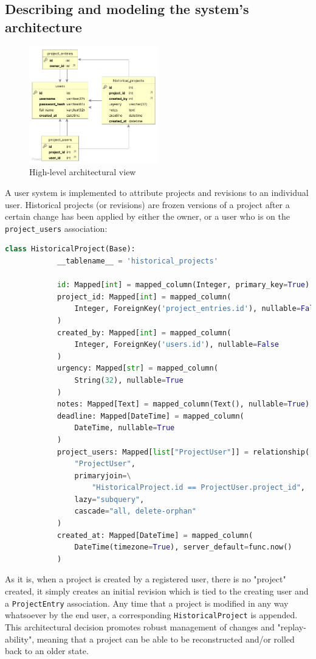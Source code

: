 \documentclass{report}
\begin{document}
	\subsection{Describing and modeling the system’s architecture}
	\vspace{1em}
	\begin{figure}[h]
		\centering
		\includegraphics[width=0.5\textwidth]{overview}
		\caption{High-level architectural view}
	\end{figure}
	\vspace{1em}
	A user system is implemented to attribute projects and revisions to an individual user. Historical projects (or revisions)
	are frozen versions of a project after a certain change has been applied by either the owner, or a user who is 
	on the \verb|project_users| association:
	\vspace{1.5em}
	\begin{lstlisting}[language=Python]
		class HistoricalProject(Base):
			__tablename__ = 'historical_projects'
			
			id: Mapped[int] = mapped_column(Integer, primary_key=True)
			project_id: Mapped[int] = mapped_column(
				Integer, ForeignKey('project_entries.id'), nullable=False
			)
			created_by: Mapped[int] = mapped_column(
				Integer, ForeignKey('users.id'), nullable=False
			)
			urgency: Mapped[str] = mapped_column(
				String(32), nullable=True
			)
			notes: Mapped[Text] = mapped_column(Text(), nullable=True)
			deadline: Mapped[DateTime] = mapped_column(
				DateTime, nullable=True
			)
			project_users: Mapped[list["ProjectUser"]] = relationship(
				"ProjectUser",
				primaryjoin=\
					"HistoricalProject.id == ProjectUser.project_id",
				lazy="subquery",
				cascade="all, delete-orphan"
			)
			created_at: Mapped[DateTime] = mapped_column(
				DateTime(timezone=True), server_default=func.now()
			)
	\end{lstlisting}
	\vspace{1.5em}
	As it is, when a project is created by a registered user, there is no "project" created, it simply creates an initial
	revision which is tied to the creating user and a \verb|ProjectEntry| association.
	Any time that a project is modified in any way whatsoever by the end user, a corresponding \verb|HistoricalProject|
	is appended. This architectural decision promotes robust management of changes and "replay-ability", meaning
	that a project can be able to be reconstructed and/or rolled back to an older state.
	
\end{document}
